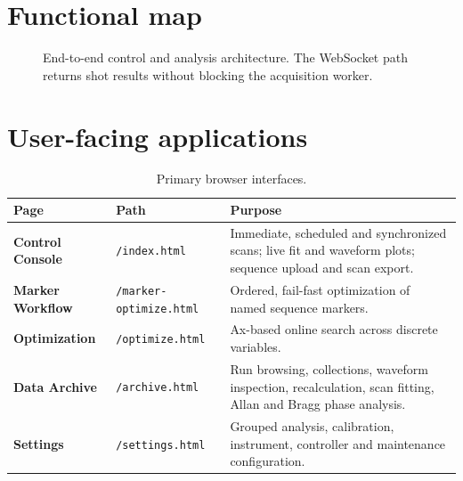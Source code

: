 \documentclass[11pt,oneside,openany]{book}
\newcommand{\code}[1]{\texttt{\detokenize{#1}}}
\newcommand{\pathcode}[1]{\nolinkurl{#1}}
\begin{document}
\section{Functional map}
\begin{figure}[htbp]
\centering
{}
\caption{End-to-end control and analysis architecture. The WebSocket path returns shot
results without blocking the acquisition worker.}
\label{fig:architecture}
\end{figure}

\section{User-facing applications}
\begin{table}[htbp]
\centering
\caption{Primary browser interfaces.}
\begin{tabularx}{\textwidth}{>{\bfseries}l l X}
\toprule
Page & Path & Purpose\\
\midrule
Control Console & \pathcode{/index.html} & Immediate, scheduled and synchronized scans;
live fit and waveform plots; sequence upload and scan export.\\
Marker Workflow & \pathcode{/marker-optimize.html} & Ordered, fail-fast optimization of
named sequence markers.\\
Optimization & \pathcode{/optimize.html} & Ax-based online search across discrete
\code{PARAMETER} variables.\\
Data Archive & \pathcode{/archive.html} & Run browsing, collections, waveform inspection,
recalculation, scan fitting, Allan and Bragg phase analysis.\\
Settings & \pathcode{/settings.html} & Grouped analysis, calibration, instrument,
controller and maintenance configuration.\\
\bottomrule
\end{tabularx}
\end{table}
\end{document}
